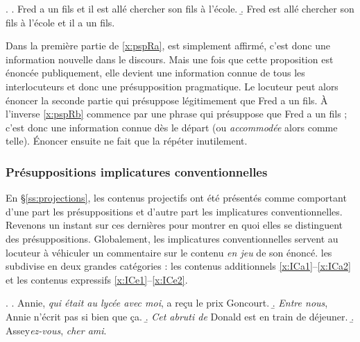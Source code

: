 \begin{refsegment}
\ex.\label{x:pspR1}
\a. Fred a un fils et il est allé chercher son fils à l'école.\label{x:pspRa} 
\b. \juge{\zarb} Fred est allé chercher son fils à l'école et il a un fils.\label{x:pspRb}


Dans la première partie de \ref{x:pspRa},  est simplement affirmé, c'est donc une information nouvelle dans le discours.  Mais une fois que cette proposition est énoncée publiquement, elle devient une information connue de tous les interlocuteurs et donc une présupposition pragmatique.  Le locuteur peut alors énoncer la seconde partie qui présuppose légitimement que Fred a un fils.  
À l'inverse \ref{x:pspRb} commence par une phrase qui présuppose que Fred a un fils ; c'est donc une information connue dès le départ (ou \emph{accommodée} alors comme telle).  Énoncer ensuite  ne fait que la répéter inutilement.


\subsubsection{Présuppositions {\vs} implicatures conventionnelles}
\label{sss:pIC}

En \S\ref{ss:projections}, les contenus projectifs ont été présentés comme comportant d'une part les présuppositions et d'autre part les implicatures conventionnelles.  Revenons un instant sur ces dernières pour montrer en quoi elles se distinguent des présuppositions.  Globalement, les implicatures conventionnelles servent au locuteur à véhiculer un commentaire sur le contenu \emph{en jeu} de son énoncé. \citet{Potts:05} les subdivise en deux grandes catégories : les contenus additionnels \ref{x:ICa1}--\ref{x:ICa2} et les contenus expressifs \ref{x:ICe1}--\ref{x:ICe2}.

\ex.
\a. Annie, \emph{qui était au lycée avec moi}, a reçu le prix Goncourt.\label{x:ICa1}
\b. \emph{Entre nous}, Annie n'écrit pas si bien que ça.\label{x:ICa2}
\b. \emph{Cet abruti de} Donald est en train de déjeuner.\label{x:ICe1}
\b. Assey\emph{ez-vous}, \emph{cher ami}.\label{x:ICe2}



\end{refsegment}
